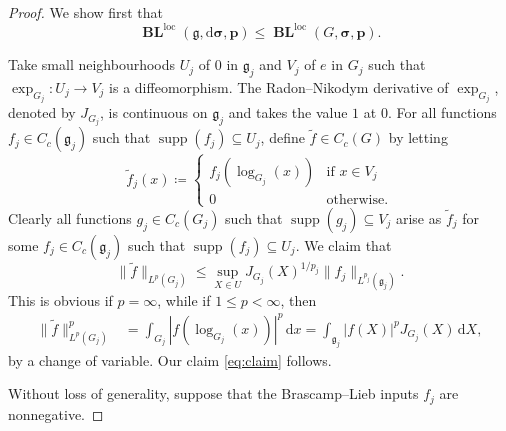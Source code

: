 \documentclass[10pt,a4paper]{amsart}
\newcommand{\BL}{\operatorname{\mathbf{BL}}}
\newcommand{\Lie}[1]{\mathfrak{#1}}
\newcommand{\bsDs}{\boldsymbol{\mathrm{d}\sigma}}
\newcommand{\bsp}{\boldsymbol{p}}
\newcommand{\bss}{\boldsymbol{\sigma}}
\newcommand{\labs}{\left\vert}
\newcommand{\loc}{\mathrm{loc}}
\newcommand{\rabs}{\right\vert}
\newcommand{\supp}{\operatorname{supp}}
\newcommand{\wrt}[1]{\,\mathrm{d} #1}
\begin{document}
\begin{proof}
We show first that
\[
\BL^{\loc}(\Lie{g},\bsDs ,\bsp)\leq \BL^{\loc}(G,\bss ,\bsp) .
\]

Take small neighbourhoods $U_j$ of $0$ in $\Lie{g}_j$ and $V_j$ of $e$ in $G_j$ such that $\exp_{G_j} \colon U_j \to V_j $ is a diffeomorphism.
The Radon--Nikodym derivative of $\exp_{G_j}$,  denoted by $J_{G_j}$, is continuous on $\Lie{g}_j$ and takes the value $1$ at $0$.
For all functions $f_j \in C_c(\Lie{g}_j)$ such that $\supp(f_j) \subseteq U_j$, define $\tilde{f} \in C_c(G) $ by letting 
\begin{equation}\label{eq:def-approx-fn}
\tilde f_j(x)\coloneqq  
\begin{cases}
f_j (\log_{G_j} (x))  & \text{if $x \in V_j$} \\
0                      & \text{otherwise}.  
\end{cases}
\end{equation}
Clearly all functions $g_j \in C_c(G_j)$ such that $\supp(g_j) \subseteq V_j$ arise as $\tilde f_j$ for some $f_j \in C_c(\Lie{g}_j)$ such that $\supp(f_j) \subseteq U_j$. 
We claim that 
\begin{equation}\label{eq:claim}
\| \tilde{f} \|_{L^p({G_j})} 
\leq \sup_{X \in U} J_{G_j}(X)^{1/p_j} \| f_j \|_{L^{p_j} (\Lie{g}_j)}.
\end{equation}
This is obvious if $p=\infty$, while if $1\leq p<\infty$, then
\begin{align*}
\| \tilde {f} \|^p_{L^p({G_j})}
&=\int_{G_j} \labs  f(\log_{G_j} (x)) \rabs ^p\wrt x
=\int_{\Lie{g}_j}  \labs f(X) \rabs ^p J_{G_j}(X)\wrt X,
\end{align*}
by a change of variable.
Our claim \eqref{eq:claim} follows.

Without loss of generality, suppose  that the Brascamp--Lieb inputs $f_j$ are nonnegative.


\end{proof}
\end{document}
